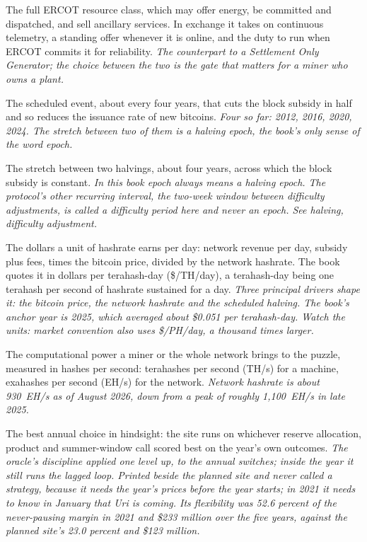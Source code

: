 \begin{description}[leftmargin=0pt,style=unboxed,itemsep=0.35em,parsep=0.15em]
\item[generation resource] \hypertarget{glossary:generation-resource}{}The full ERCOT resource class, which may offer energy, be committed and dispatched, and sell ancillary services. In exchange it takes on continuous telemetry, a standing offer whenever it is online, and the duty to run when ERCOT commits it for reliability. \emph{The counterpart to a Settlement Only Generator; the choice between the two is the gate that matters for a miner who owns a plant.}
\item[halving] \hypertarget{glossary:halving}{}The scheduled event, about every four years, that cuts the block subsidy in half and so reduces the issuance rate of new bitcoins. \emph{Four so far: 2012, 2016, 2020, 2024. The stretch between two of them is a halving epoch, the book's only sense of the word epoch.}
\item[halving epoch] \hypertarget{glossary:halving-epoch}{}The stretch between two halvings, about four years, across which the block subsidy is constant. \emph{In this book epoch always means a halving epoch. The protocol's other recurring interval, the two-week window between difficulty adjustments, is called a difficulty period here and never an epoch. See halving, difficulty adjustment.}
\item[hashprice] \hypertarget{glossary:hashprice}{}The dollars a unit of hashrate earns per day: network revenue per day, subsidy plus fees, times the bitcoin price, divided by the network hashrate. The book quotes it in dollars per terahash-day (\$/TH/day), a terahash-day being one terahash per second of hashrate sustained for a day. \emph{Three principal drivers shape it: the bitcoin price, the network hashrate and the scheduled halving. The book's anchor year is 2025, which averaged about \$0.051 per terahash-day. Watch the units: market convention also uses \$/PH/day, a thousand times larger.}
\item[hashrate] \hypertarget{glossary:hashrate}{}The computational power a miner or the whole network brings to the puzzle, measured in hashes per second: terahashes per second (TH/s) for a machine, exahashes per second (EH/s) for the network. \emph{Network hashrate is about 930~EH/s as of August 2026, down from a peak of roughly 1,100~EH/s in late 2025.}
\item[hindsight ceiling] \hypertarget{glossary:hindsight-ceiling}{}The best annual choice in hindsight: the site runs on whichever reserve allocation, product and summer-window call scored best on the year's own outcomes. \emph{The oracle's discipline applied one level up, to the annual switches; inside the year it still runs the lagged loop. Printed beside the planned site and never called a strategy, because it needs the year's prices before the year starts; in 2021 it needs to know in January that Uri is coming. Its flexibility was 52.6 percent of the never-pausing margin in 2021 and \$233 million over the five years, against the planned site's 23.0 percent and \$123 million.}

\end{description}
